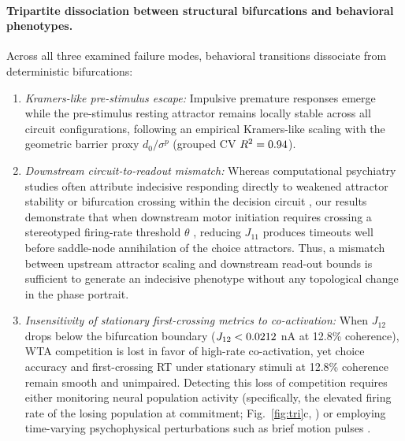 \documentclass[11pt]{article}
\begin{document}
	\paragraph{Tripartite dissociation between structural bifurcations and behavioral phenotypes.}
	Across all three examined failure modes, behavioral transitions dissociate from deterministic bifurcations:
	\begin{enumerate}[leftmargin=*]
		\item \emph{Kramers-like pre-stimulus escape:} Impulsive premature responses emerge while the pre-stimulus resting attractor remains locally stable across all \nRestTotal{} circuit configurations, following an empirical Kramers-like scaling with the geometric barrier proxy $d_0/\sigma^p$ (grouped CV $R^2=0.94$).
		\item \emph{Downstream circuit-to-readout mismatch:} Whereas computational psychiatry studies often attribute indecisive responding directly to weakened attractor stability or bifurcation crossing within the decision circuit \citep{Lam2022}, our results demonstrate that when downstream motor initiation requires crossing a stereotyped firing-rate threshold $\theta$ \citep{RoitmanShadlen2002, Kiani2008, Standage2014}, reducing $J_{11}$ produces timeouts well before saddle-node annihilation of the choice attractors. Thus, a mismatch between upstream attractor scaling and downstream read-out bounds is sufficient to generate an indecisive phenotype without any topological change in the phase portrait.
		\item \emph{Insensitivity of stationary first-crossing metrics to co-activation:} When $J_{12}$ drops below the bifurcation boundary ($J_{12}<0.0212$ nA at 12.8\% coherence), WTA competition is lost in favor of high-rate co-activation, yet choice accuracy and first-crossing RT under stationary stimuli at 12.8\% coherence remain smooth and unimpaired. Detecting this loss of competition requires either monitoring neural population activity (specifically, the elevated firing rate of the losing population at commitment; Fig.~\ref{fig:tri}c, \citealp{Insabato2010}) or employing time-varying psychophysical perturbations such as brief motion pulses \citep{HukShadlen2005, Wong2007, WongHuk2008, Lam2022}.
	\end{enumerate}
	
\end{document}
